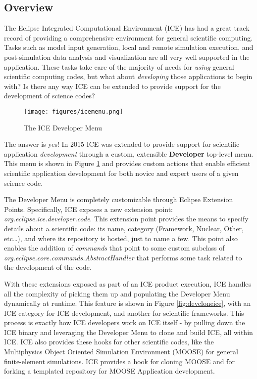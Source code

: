 \subsection*{Overview}
The Eclipse Integrated Computational Environment (ICE) has had a great track
record of providing a comprehensive environment for general scientific
computing. Tasks such as model input generation, local and remote simulation
execution, and post-simulation data analysis and visualization are all very well
supported in the application. These tasks take care of the majority of needs
for \emph{using} general scientific computing codes, but what about
\emph{developing} those applications to begin with? Is there any way ICE can be
extended to provide support for the development of science codes?

\begin{figure}[h]
\texttt{[image: figures/icemenu.png]}
\centering
\caption{The ICE Developer Menu}
\label{fig:devmenu}
\end{figure}

The answer is yes! In 2015 ICE was extended to provide support for scientific
application \emph{development} through a custom, extensible \textbf{Developer} 
top-level menu. This menu is shown in Figure
\ref{fig:devmenu} and provides custom actions that enable efficient scientific
application development for both novice and expert users of a given science
code.

The Developer Menu is completely customizable through Eclipse Extension Points.
Specifically, ICE exposes a new extension point:
\emph{org.eclipse.ice.developer.code}. This extension point provides the means
to specify details about a scientific code: its name, category (Framework,
Nuclear, Other, etc\ldots), and where its repository is hosted, just to name a
few. This point also enables the addition of \emph{commands} that point to some
custom subclass of \emph{org.eclipse.core.commands.AbstractHandler} that
performs some task related to the development of the code.

With these extensions exposed as part of an ICE product execution, ICE
handles all the complexity of picking them up and populating the Developer Menu
dynamically at runtime. This feature is shown in Figure \ref{fig:devcloneice},
with an ICE category for ICE development, and another for scientific frameworks.
This process is exactly how ICE developers work on ICE itself - by pulling down
the ICE binary and leveraging the Developer Menu to clone and build ICE, all
within ICE. ICE also provides these hooks for other scientific codes, like the
Multiphysics Object Oriented Simulation Environment (MOOSE) for general
finite-element simulations. ICE provides a hook for cloning MOOSE and for
forking a templated repository for MOOSE Application development.

